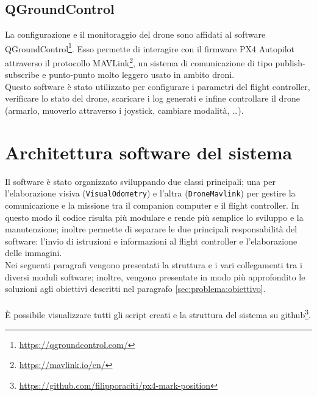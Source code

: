 \subsection{QGroundControl}
La configurazione e il monitoraggio del drone sono affidati al software QGroundControl\footnote{\url{https://qgroundcontrol.com/}}. Esso permette di interagire con il firmware PX4 Autopilot attraverso il protocollo MAVLink\footnote{\url{https://mavlink.io/en/}}, un sistema di comunicazione di tipo publish-subscribe e punto-punto molto leggero usato in ambito droni. \\
Questo software è stato utilizzato per configurare i parametri del flight controller, verificare lo stato del drone, scaricare i log generati e infine controllare il drone (armarlo, muoverlo attraverso i joystick, cambiare modalità, \ldots).

\section{Architettura software del sistema}
\label{sec:archi:software}
Il software è stato organizzato sviluppando due classi principali; una per l'elaborazione visiva (\texttt{VisualOdometry}) e l'altra (\texttt{DroneMavlink}) per gestire la comunicazione e la missione tra il companion computer e il flight controller. In questo modo il codice risulta più modulare e rende più semplice lo sviluppo e la manutenzione; inoltre permette di separare le due principali responsabilità del software: l'invio di istruzioni e informazioni al flight controller e l'elaborazione delle immagini. \\
Nei seguenti paragrafi vengono presentati la struttura e i vari collegamenti tra i diversi moduli software; inoltre, vengono presentate in modo più approfondito le soluzioni agli obiettivi descritti nel paragrafo \ref{sec:problema:obiettivo}. \\ \\
È possibile visualizzare tutti gli script creati e la struttura del sistema su github\footnote{\url{https://github.com/filipporaciti/px4-mark-position}}.

